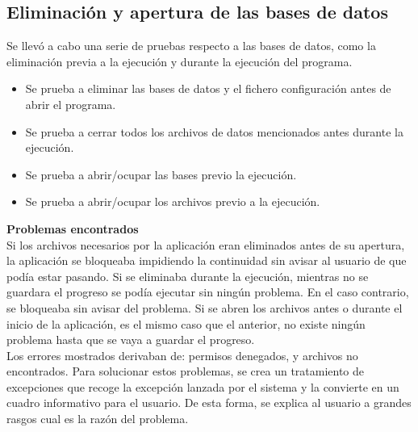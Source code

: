 \subsection{Eliminación y apertura de las bases de datos}
Se llevó a cabo una serie de pruebas respecto a las bases de datos, como la eliminación previa a la ejecución y durante la ejecución del programa.
\begin{itemize}
\item Se prueba a eliminar las bases de datos y el fichero configuración antes de abrir el programa.
\item Se prueba a cerrar todos los archivos de datos mencionados antes durante la ejecución.
\item Se prueba a abrir/ocupar las bases previo la ejecución.
\item Se prueba a abrir/ocupar los archivos previo a la ejecución.
\end{itemize}
\textbf{Problemas encontrados}\\
Si los archivos necesarios por la aplicación eran eliminados antes de su apertura, la aplicación se bloqueaba impidiendo la continuidad sin avisar al usuario de que podía estar pasando. Si se eliminaba durante la ejecución, mientras no se guardara el progreso se podía ejecutar sin ningún problema. En el caso contrario, se bloqueaba sin avisar del problema. Si se abren los archivos antes o durante el inicio de la aplicación, es el mismo caso que el anterior, no existe ningún problema hasta que se vaya a guardar el progreso.\\
Los errores mostrados derivaban de: permisos denegados, y archivos no encontrados. Para solucionar estos problemas, se crea un tratamiento de excepciones que recoge la excepción lanzada por el sistema y la convierte en un cuadro informativo para el usuario. De esta forma, se explica al usuario a grandes rasgos cual es la razón del problema.